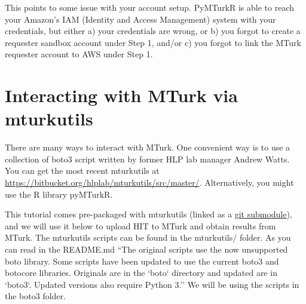 \documentclass{article}
\begin{document}
This points to some issue with your account setup. PyMTurkR is able to reach your Amazon's IAM (Identity and Access Management) system with your credentials, but either a) your credentials are wrong, or b) you forgot to create a requester sandbox account under Step 1, and/or c) you forgot to link the MTurk requester account to AWS under Step 1.





\section{Interacting with MTurk via mturkutils}

There are many ways to interact with MTurk. One convenient way is to use a collection of boto3 script written by former HLP lab manager Andrew Watts. You can get the most recent mturkutils at \url{https://bitbucket.org/hlplab/mturkutils/src/master/}. Alternatively, you might use the R library pyMTurkR. 

This tutorial comes pre-packaged with mturkutils (linked as a \href{https://git-scm.com/book/en/v2/Git-Tools-Submodules}{git submodule}), and we will use it below to upload HIT to MTurk and obtain results from MTurk. The mturkutils scripts can be found in the mturkutils/ folder.  As you can read in the README.md ``The original scripts use the now unsupported boto library. Some scripts have been updated to use the current boto3 and botocore libraries. Originals are in the `boto` directory and updated are in `boto3`. Updated versions also require Python 3.'' We will be using the scripts in the boto3 folder. 


\end{document}
